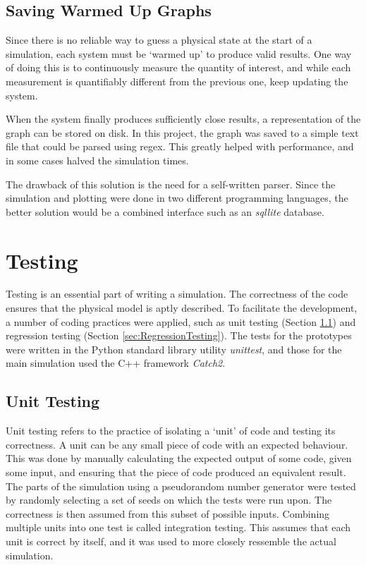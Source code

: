 \subsection{Saving Warmed Up Graphs}
\label{subsec:SavingWarmedUpGraphs}

Since there is no reliable way to guess a physical state at the start of a simulation, each system must be `warmed up' to produce valid results. One way of doing this is to continuously measure the quantity of interest, and while each measurement is quantifiably different from the previous one, keep updating the system.

When the system finally produces sufficiently close results, a representation of the graph can be stored on disk. In this project, the graph was saved to a simple text file that could be parsed using regex. This greatly helped with performance, and in some cases halved the simulation times.

The drawback of this solution is the need for a self-written parser. Since the simulation and plotting were done in two different programming languages, the better solution would be a combined interface such as an \textit{sqllite} database.

\section{Testing}
\label{sec:Testing}

Testing is an essential part of writing a simulation. The correctness of the code ensures that the physical model is aptly described. To facilitate the development, a number of coding practices were applied, such as unit testing (Section \ref{sec:UnitTesting}) and regression testing (Section \ref{sec:RegressionTesting}). The tests for the prototypes were written in the Python standard library utility \textit{unittest}, and those for the main simulation used the C++ framework \textit{Catch2}.

\subsection{Unit Testing}
\label{sec:UnitTesting}

Unit testing refers to the practice of isolating a `unit' of code and testing its correctness. A unit can be any small piece of code with an expected behaviour. This was done by manually calculating the expected output of some code, given some input, and ensuring that the piece of code produced an equivalent result. The parts of the simulation using a pseudorandom number generator were tested by randomly selecting a set of seeds on which the tests were run upon. The correctness is then assumed from this subset of possible inputs. Combining multiple units into one test is called integration testing. This assumes that each unit is correct by itself, and it was used to more closely ressemble the actual simulation.

